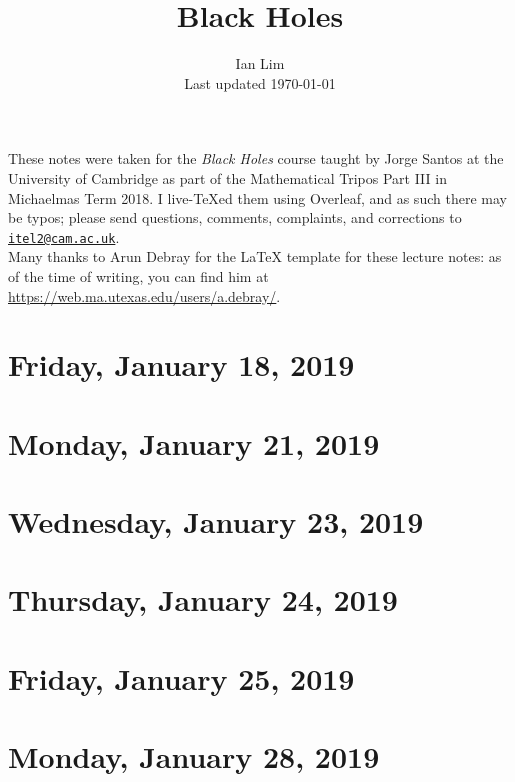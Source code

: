 \documentclass[reqno]{amsart}
\begin{document}
\title{Black Holes}
\author{Ian Lim\\ Last updated \today}
\maketitle
{\small\noindent These notes were taken for the \textit{Black Holes} course taught by Jorge Santos at the University of Cambridge as part of the Mathematical Tripos Part III in Michaelmas Term 2018. I live-\TeX ed them using Overleaf, and as such there may be typos; please send questions, comments, complaints, and corrections to 
\href{mailto:itel2@cam.ac.uk?subject=BH\%20Lecture\%20Notes}{\texttt{itel2@cam.ac.uk}}.\\
Many thanks to Arun Debray for the {\LaTeX} template for these lecture notes: as of the time of writing, you can find him at \url{https://web.ma.utexas.edu/users/a.debray/}.}

\tableofcontents

\section{Friday, January 18, 2019}
	

\section{Monday, January 21, 2019}
    

\section{Wednesday, January 23, 2019}
    

\section{Thursday, January 24, 2019}
    

\section{Friday, January 25, 2019}
    
    
\section{Monday, January 28, 2019}
    
    
\end{document}
